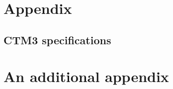 \appendix
\chapter{Appendix}

\section{CTM3 specifications}\label{app:CTM3}






\cleardoublepage


\chapter{An additional appendix}
\cleardoublepage
